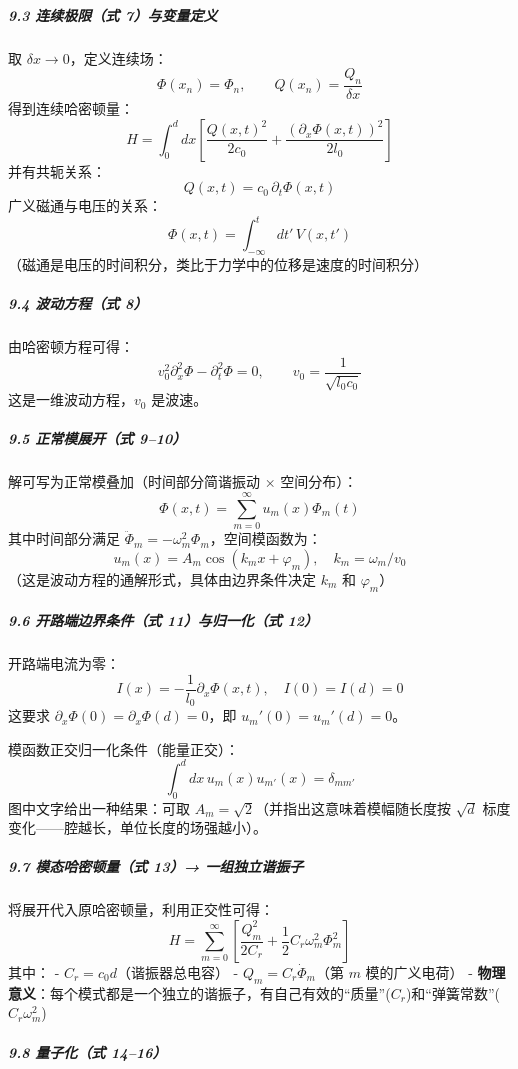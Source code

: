 \documentclass[12pt,a4paper,oneside]{ctexbook}
\let\oldsubparagraph\subparagraph
\renewcommand{\subparagraph}[1]{\oldsubparagraph{#1}\mbox{}}
\begin{document}
\subparagraph{9.3 连续极限（式
7）与变量定义}\label{ux8fdeux7eedux6781ux9650ux5f0f-7ux4e0eux53d8ux91cfux5b9aux4e49}

取 \(\delta x\to 0\)，定义连续场：
\[\Phi(x_n)=\Phi_n,\qquad Q(x_n)=\frac{Q_n}{\delta x}\]
得到连续哈密顿量：
\[H=\int_0^d dx\left[\frac{Q(x,t)^2}{2c_0}+\frac{(\partial_x\Phi(x,t))^2}{2l_0}\right]\]
并有共轭关系： \[Q(x,t)=c_0\,\partial_t\Phi(x,t)\]
广义磁通与电压的关系： \[\Phi(x,t)=\int_{-\infty}^{t}dt'\,V(x,t')\]
（磁通是电压的时间积分，类比于力学中的位移是速度的时间积分）

\subparagraph{9.4 波动方程（式
8）}\label{ux6ce2ux52a8ux65b9ux7a0bux5f0f-8}

由哈密顿方程可得：
\[v_0^2\partial_x^2\Phi-\partial_t^2\Phi=0,\qquad v_0=\frac{1}{\sqrt{l_0c_0}}\]
这是一维波动方程，\(v_0\) 是波速。

\subparagraph{9.5 正常模展开（式
9--10）}\label{ux6b63ux5e38ux6a20ux5c55ux5f00ux5f0f-910}

解可写为正常模叠加（时间部分简谐振动 × 空间分布）：
\[\Phi(x,t)=\sum_{m=0}^{\infty}u_m(x)\Phi_m(t)\] 其中时间部分满足
\(\ddot{\Phi}_m=-\omega_m^2\Phi_m\)，空间模函数为：
\[u_m(x)=A_m\cos(k_m x+\varphi_m),\quad k_m=\omega_m/v_0\]
（这是波动方程的通解形式，具体由边界条件决定 \(k_m\) 和 \(\varphi_m\)）

\subparagraph{9.6 开路端边界条件（式 11）与归一化（式
12）}\label{ux5f00ux8defux7aefux8fb9ux754cux6761ux4ef6ux5f0f-11ux4e0eux5f52ux4e00ux5316ux5f0f-12}

开路端电流为零：
\[I(x)= -\frac{1}{l_0}\partial_x\Phi(x,t),\quad I(0)=I(d)=0\] 这要求
\(\partial_x\Phi(0)=\partial_x\Phi(d)=0\)，即 \(u_m'(0)=u_m'(d)=0\)。

模函数正交归一化条件（能量正交）：
\[\int_0^d dx\,u_m(x)u_{m'}(x)=\delta_{mm'}\] 图中文字给出一种结果：可取
\(A_m=\sqrt{2}\)（并指出这意味着模幅随长度按 \(\sqrt{d}\)
标度变化------腔越长，单位长度的场强越小）。

\subparagraph{9.7 模态哈密顿量（式 13）→
一组独立谐振子}\label{ux6a21ux6001ux54c8ux5bc6ux987fux91cfux5f0f-13-ux4e00ux7ec4ux72ecux7acbux8c10ux632fux5b50}

将展开代入原哈密顿量，利用正交性可得：
\[H=\sum_{m=0}^{\infty}\left[\frac{Q_m^2}{2C_r}+\frac{1}{2}C_r\omega_m^2\Phi_m^2\right]\]
其中： - \(C_r=c_0d\)（谐振器总电容） - \(Q_m=C_r\dot{\Phi}_m\)（第
\(m\) 模的广义电荷） -
\textbf{物理意义}：每个模式都是一个独立的谐振子，有自己有效的``质量''(\(C_r\))和``弹簧常数''(\(C_r\omega_m^2\))

\subparagraph{9.8 量子化（式
14--16）}\label{ux91cfux5b50ux5316ux5f0f-1416}
\end{document}
